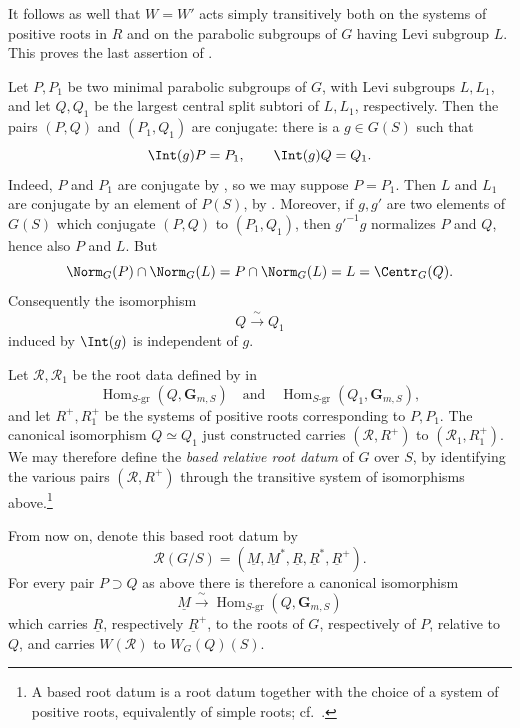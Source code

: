 It follows as well that \(W=W'\) acts simply transitively both on
the systems of positive roots in \(R\) and on the parabolic
subgroups of \(G\) having Levi subgroup \(L\).  This proves the last
assertion of .
\SGAQED



Let \(P,P_1\) be two minimal parabolic subgroups of \(G\), with
Levi subgroups \(L,L_1\), and let \(Q,Q_1\) be the largest central
split subtori of \(L,L_1\), respectively.  Then the pairs
\((P,Q)\) and \((P_1,Q_1)\) are conjugate: there is a \(g\in G(S)\)
such that
\[
 \Int(g)P=P_1,\qquad \Int(g)Q=Q_1.
\]
Indeed, \(P\) and \(P_1\) are conjugate by , so we may suppose
\(P=P_1\).  Then \(L\) and \(L_1\) are conjugate by an element of
\(P(S)\), by .  Moreover, if \(g,g'\) are two elements of \(G(S)\)
which conjugate \((P,Q)\) to \((P_1,Q_1)\), then \(g'^{-1}g\)
normalizes \(P\) and \(Q\), hence also \(P\) and \(L\).  But
\[
 \Norm_G(P)\cap\Norm_G(L)
 =P\cap\Norm_G(L)
 =L
 =\Centr_G(Q).
\]
Consequently the isomorphism
\[
 Q\xrightarrow{\ \sim\ }Q_1
\]
induced by \(\Int(g)\) is independent of \(g\).

Let \(\mathcal R,\mathcal R_1\) be the root data defined by  in
\[
 \operatorname{Hom}_{S\text{-}\mathrm{gr}}(Q,\mathbf G_{m,S})
 \quad\text{and}\quad
 \operatorname{Hom}_{S\text{-}\mathrm{gr}}(Q_1,\mathbf G_{m,S}),
\]
and let \(R^+,R_1^+\) be the systems of positive roots corresponding
to \(P,P_1\).  The canonical isomorphism \(Q\simeq Q_1\) just
constructed carries \((\mathcal R,R^+)\) to
\((\mathcal R_1,R_1^+)\).  We may therefore define the
\emph{based relative root datum} of \(G\) over \(S\), by identifying
the various pairs \((\mathcal R,R^+)\) through the transitive system
of isomorphisms above.\footnote{A based root datum is a root datum
together with the choice of a system of positive roots, equivalently
of simple roots; cf.\ .}

From now on, denote this based root datum by
\[
 \mathcal R(G/S)
 =(\underline M,\underline M^*,\underline R,
   \underline R^*,\underline R^+).
\]
For every pair \(P\supset Q\) as above there is therefore a
canonical isomorphism
\[
 \underline M\xrightarrow{\ \sim\ }
 \operatorname{Hom}_{S\text{-}\mathrm{gr}}(Q,\mathbf G_{m,S})
\]
which carries \(\underline R\), respectively \(\underline R^+\), to
the roots of \(G\), respectively of \(P\), relative to \(Q\), and
carries \(W(\mathcal R)\) to \(W_G(Q)(S)\).

